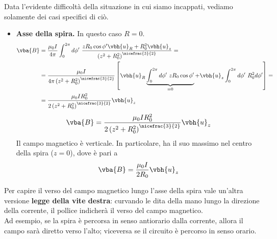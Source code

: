 Data l'evidente difficoltà della situazione in cui siamo incappati, vediamo solamente dei casi specifici di ciò.
\begin{itemize}
	\item \textbf{Asse della spira.} In questo caso $R=0$.
	\begin{align*}
		\vba{B}&=\frac{\mu_0 I}{4\pi }\int_0^{2\pi}d\phi'\ \frac{zR_0\cos\phi'\vbh{u}_R+R_0^2\vbh{u}_z}{\left(z^2+R_0^2\right)^{\nicefrac{3}{2}}}=\\
		&=\frac{\mu_0 I}{4\pi \left(z^2+R_0^2\right)^{\nicefrac{3}{2}}}\left[\vbh{u}_R\underbrace{\int_0^{2\pi}d\phi'\ zR_0\cos\phi'}_{=0} + \vbh{u}_z \int_0^{2\pi}d\phi'\ R_0^2d\phi'\right]=\\
		&=\frac{\mu_0 I R_0^2}{2 \left(z^2+R_0^2\right)^{\nicefrac{3}{2}}}\vbh{u}_z
	\end{align*}
	\begin{equation}
		\vba{B}=\frac{\mu_0 I R_0^2}{2 \left(z^2+R_0^2\right)^{\nicefrac{3}{2}}}\vbh{u}_z
	\end{equation}
	Il campo magnetico è verticale. In particolare, ha il suo massimo nel centro della spira ($z=0$), dove è pari a
	\begin{equation}
		\vba{B}=\frac{\mu_0 I}{2R_0}\vbh{u}_z
	\end{equation}
\end{itemize}
\begin{observe}
	Per capire il verso del campo magnetico lungo l'asse della spira vale un'altra versione \textbf{legge della vite destra}: curvando le dita della mano lungo la direzione della corrente, il pollice indicherà il verso del campo magnetico.\\
	Ad esempio, se la spira è percorsa in senso antiorario dalla corrente, allora il campo sarà diretto verso l'alto; viceversa se il circuito è percorso in senso orario.
\end{observe}
